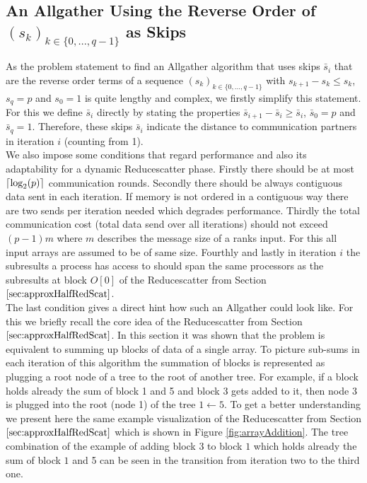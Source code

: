\subsection{An Allgather Using the Reverse Order of $(s_k)_{k\in \{0,\dots, q-1\}}$ as Skips}
As the problem statement to find an Allgather algorithm that uses skips $\bar{s}_i$ that are the reverse order terms of a sequence $(s_k)_{k\in \{0,\dots, q-1\}}$ with $s_{k+1} - s_k \leq s_k$, $s_q=p$ and $s_0=1$ is quite lengthy and complex, we firstly simplify this statement. For this we define $\bar{s}_i$ directly by stating the properties $\bar{s}_{i+1} - \bar{s}_i \geq \bar{s}_i$, $\bar{s}_0=p$ and $\bar{s}_q=1$. Therefore, these skips $\bar{s}_i$ indicate the distance to communication partners in iteration $i$ (counting from 1). \\
We also impose some conditions that regard performance and also its adaptability for a dynamic Reducescatter phase. Firstly there should be at most $\lceil\log_2(p)\rceil$ communication rounds. Secondly there should be always contiguous data sent in each iteration. If memory is not ordered in a contiguous way there are two sends per iteration needed which degrades performance. Thirdly the total communication cost (total data send over all iterations) should not exceed $(p-1)m$ where $m$ describes the message size of a ranks input. For this all input arrays are assumed to be of same size. Fourthly and lastly in iteration $i$ the  subresults a process has access to should span the same processors as the  subresults at block $O[0]$ of the Reducescatter from Section $\ref{sec:approxHalfRedScat}$.\\
The last condition gives a direct hint how such an Allgather could look like. For this we briefly recall the core idea of the Reducescatter from Section $\ref{sec:approxHalfRedScat}$. In this section it was shown that the problem is equivalent to summing up blocks of data of a single array. To picture sub-sums in each iteration of this algorithm the summation of blocks is represented as plugging a root node of a tree to the root of another tree. For example, if a block holds  already the sum of block 1 and 5 and block 3 gets added to it, then node 3 is plugged into the root (node 1) of the tree $1\leftarrow 5$. To get a better understanding we present here the same example visualization of the Reducescatter from Section $\ref{sec:approxHalfRedScat}$ which is shown in Figure \ref{fig:arrayAddition}. The tree combination of the example of adding block $3$ to block $1$ which holds already the sum of block $1$ and 5 can be seen in the transition from iteration two to the third one.
